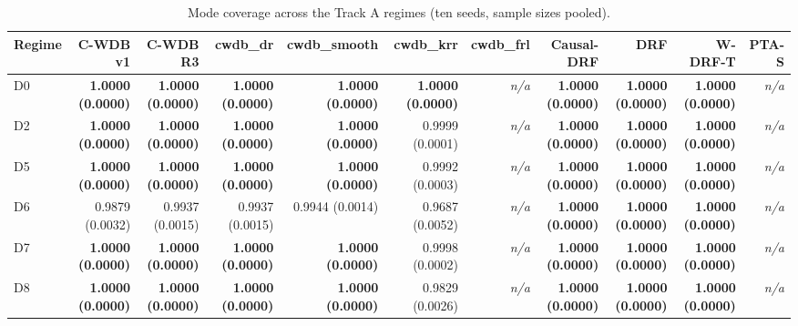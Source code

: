 \begin{table}[htbp]
\centering
\caption{Mode coverage across the Track A regimes (ten seeds, sample sizes pooled).}
\label{tab:p6-trackA-mode_coverage}
\small
\begin{tabular}{@{}lrrrrrrrrrr@{}}
\toprule
Regime & C-WDB v1 & C-WDB R3 & cwdb\_dr & cwdb\_smooth & cwdb\_krr & cwdb\_frl & Causal-DRF & DRF & W-DRF-T & PTA-S \\ 
\midrule
D0 & \textbf{1.0000 (0.0000)} & \textbf{1.0000 (0.0000)} & \textbf{1.0000 (0.0000)} & \textbf{1.0000 (0.0000)} & \textbf{1.0000 (0.0000)} & \emph{n/a} & \textbf{1.0000 (0.0000)} & \textbf{1.0000 (0.0000)} & \textbf{1.0000 (0.0000)} & \emph{n/a} \\ 
D2 & \textbf{1.0000 (0.0000)} & \textbf{1.0000 (0.0000)} & \textbf{1.0000 (0.0000)} & \textbf{1.0000 (0.0000)} & 0.9999 (0.0001) & \emph{n/a} & \textbf{1.0000 (0.0000)} & \textbf{1.0000 (0.0000)} & \textbf{1.0000 (0.0000)} & \emph{n/a} \\ 
D5 & \textbf{1.0000 (0.0000)} & \textbf{1.0000 (0.0000)} & \textbf{1.0000 (0.0000)} & \textbf{1.0000 (0.0000)} & 0.9992 (0.0003) & \emph{n/a} & \textbf{1.0000 (0.0000)} & \textbf{1.0000 (0.0000)} & \textbf{1.0000 (0.0000)} & \emph{n/a} \\ 
D6 & 0.9879 (0.0032) & 0.9937 (0.0015) & 0.9937 (0.0015) & 0.9944 (0.0014) & 0.9687 (0.0052) & \emph{n/a} & \textbf{1.0000 (0.0000)} & \textbf{1.0000 (0.0000)} & \textbf{1.0000 (0.0000)} & \emph{n/a} \\ 
D7 & \textbf{1.0000 (0.0000)} & \textbf{1.0000 (0.0000)} & \textbf{1.0000 (0.0000)} & \textbf{1.0000 (0.0000)} & 0.9998 (0.0002) & \emph{n/a} & \textbf{1.0000 (0.0000)} & \textbf{1.0000 (0.0000)} & \textbf{1.0000 (0.0000)} & \emph{n/a} \\ 
D8 & \textbf{1.0000 (0.0000)} & \textbf{1.0000 (0.0000)} & \textbf{1.0000 (0.0000)} & \textbf{1.0000 (0.0000)} & 0.9829 (0.0026) & \emph{n/a} & \textbf{1.0000 (0.0000)} & \textbf{1.0000 (0.0000)} & \textbf{1.0000 (0.0000)} & \emph{n/a} \\ 
\bottomrule
\end{tabular}
\end{table}


